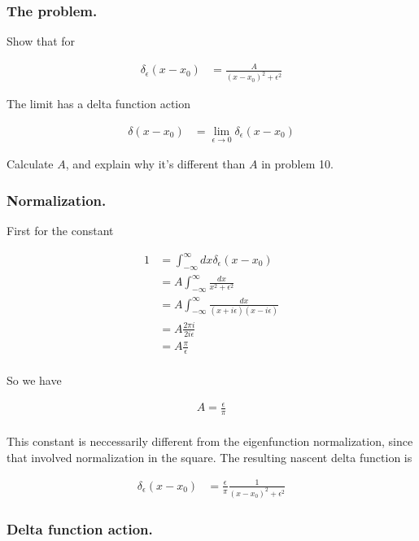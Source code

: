 \documentclass{article}
\newcommand{\IIinf}[0]{ \int_{-\infty}^\infty }
\begin{document}
\subsubsection{ The problem. }

Show that for

\begin{align*}
\delta_\epsilon(x - x_0) &= \frac{A}{(x-x_0)^2 + \epsilon^2}
\end{align*}

The limit has a delta function action

\begin{align*}
\delta(x - x_0) &= \lim_{\epsilon \rightarrow 0} \delta_\epsilon(x - x_0)
\end{align*}

Calculate $A$, and explain why it's different than $A$ in problem 10.

\subsubsection{ Normalization. }

First for the constant

\begin{align*}
1 &= \IIinf dx \delta_\epsilon(x - x_0) \\
&= A \IIinf \frac{dx}{x^2 + \epsilon^2} \\
&= A \IIinf \frac{dx}{(x + i\epsilon)(x - i \epsilon)} \\
&= A \frac{2 \pi i}{ 2 i \epsilon } \\
&= A \frac{\pi}{\epsilon } \\
\end{align*}

So we have

\begin{align*}
A = \frac{\epsilon }{\pi} \\
\end{align*}

This constant is neccessarily different from the eigenfunction normalization, since that involved normalization in the square.  The resulting 
nascent delta function is

\begin{align*}
\delta_\epsilon(x - x_0) &= \frac{\epsilon }{\pi} \frac{1}{(x-x_0)^2 + \epsilon^2}
\end{align*}

\subsubsection{ Delta function action. }
\end{document}
